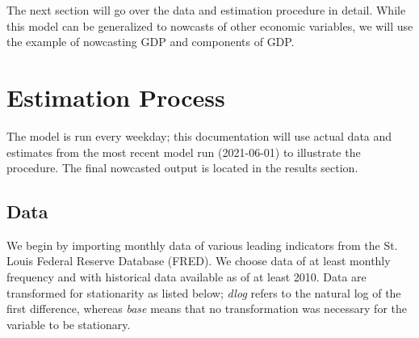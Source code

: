 \documentclass[11pt, letterpaper]{article}\usepackage[]{graphicx}\usepackage[]{color}
\begin{document}
The next section will go over the data and estimation procedure in detail. While this model can be generalized to nowcasts of other economic variables, we will use the example of nowcasting GDP and components of GDP.

\newpage
\section{Estimation Process}
The model is run every weekday; this documentation will use actual data and estimates from the most recent model run (2021-06-01) to illustrate the procedure. The final nowcasted output is located in the results section.

\subsection{Data}
We begin by importing monthly data of various leading indicators from the St. Louis Federal Reserve Database (FRED). We choose data of at least monthly frequency and with historical data available as of at least 2010. Data are transformed for stationarity as listed below; \textit{dlog} refers to the natural log of the first difference, whereas \textit{base} means that no transformation was necessary for the variable to be stationary.
\end{document}
